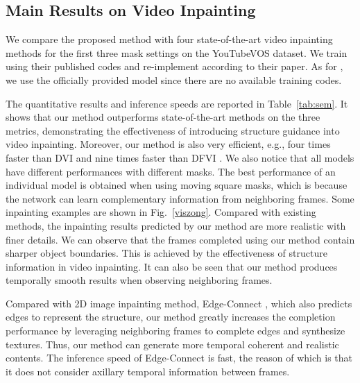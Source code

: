 




\subsection{Main Results on Video Inpainting}
We compare the proposed method with four state-of-the-art video inpainting methods \cite{nazeri2019edgeconnect,wang2019video,Kim_2019_CVPR1,Xu_2019_CVPR}
for the first three mask settings on the YouTubeVOS dataset.
%
We train \cite{nazeri2019edgeconnect,Xu_2019_CVPR} using their published codes and re-implement \cite{wang2019video} according to their paper. As for \cite{Kim_2019_CVPR1}, we use the officially provided model since there are no available training codes.

The quantitative results and inference speeds are reported in Table~\ref{tab:sem}.
It shows that our method outperforms state-of-the-art methods on the three metrics, demonstrating the effectiveness of introducing structure guidance into video inpainting.
Moreover, our method is also very efficient, e.g., four times faster than DVI \cite{Kim_2019_CVPR1} and nine times faster than DFVI \cite{Xu_2019_CVPR}. 
%
We also notice that all models have different performances with different masks. The best performance of an individual model is obtained when using moving square masks, which is because the network can learn complementary information from neighboring frames.
Some inpainting examples are shown in Fig.~\ref{viszong}.
Compared with existing methods, the inpainting results predicted by our method are more realistic with finer details. 
We can observe that the frames completed using our method contain sharper object boundaries. This is achieved by the effectiveness of structure information in video inpainting.
%
It can also be seen that our method produces temporally smooth results when observing neighboring frames. 



Compared with 2D image inpainting method, Edge-Connect \cite{nazeri2019edgeconnect},
which also predicts edges to represent the structure,
our method greatly increases the completion performance by leveraging neighboring frames to complete edges and synthesize textures. Thus, our method can generate more temporal coherent and realistic contents. The inference speed of Edge-Connect is fast, the reason of which is that it does not consider axillary temporal information between frames. 

